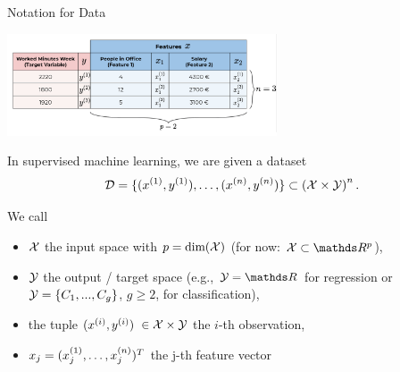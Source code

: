 \documentclass[11pt,compress,t,notes=noshow, xcolor=table]{beamer}
\begin{document}
\begin{vbframe}{Notation for Data}

\scriptsize

\begin{center}\includegraphics[width=0.6\textwidth]{figure_man/data_table} \end{center}

\normalsize

\vspace{-0.5cm}

In supervised machine learning, we are given a dataset
\[
\mathcal{D} = \{ (x^{(1)}, y^{(1)}), \ldots, (x^{(n)}, y^{(n)})\} \subset \left(\mathcal{X} \times \mathcal{Y}\right)^n.
\]

We call

\begin{itemize}
  \item $\mathcal{X}$  the input space with $p = \text{dim}(\mathcal{X})$ (for now: $\Xspace \subset \R^p$),
  \item $\mathcal{Y}$ the output / target space (e.g., $\Yspace = \R$ for regression or $\mathcal{Y} = \{C_1, ..., C_g\}$, $g \ge 2$, for classification),
  \item the tuple \((x^{(i)}, y^{(i)})\) $\in \mathcal{X}\times \mathcal{Y}$ the \(i\)-th observation,
  \item $x_j = (x^{(1)}_j, \ldots, x^{(n)}_j)^T$ the j-th feature vector
\end{itemize}

\end{vbframe}
\end{document}
